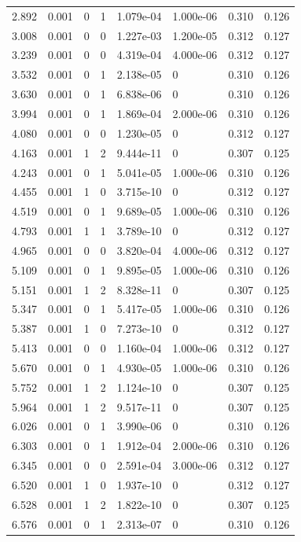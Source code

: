 \documentclass[preview]{standalone}
\begin{document}
{{\begin{tabular}{L{1.2cm}C{1.2cm} C{0.3cm}C{0.5cm} C{1.4cm}C{1.4cm} C{1.4cm}C{1.4cm}}
  2.892  &  0.001  & 0     &  1 &  1.079e-04  & 1.000e-06  & 0.310 &  0.126   \\ 
  3.008  &  0.001  & 0     &  0 &  1.227e-03  & 1.200e-05  & 0.312 &  0.127   \\ 
  3.239  &  0.001  & 0     &  0 &  4.319e-04  & 4.000e-06  & 0.312 &  0.127   \\ 
  3.532  &  0.001  & 0     &  1 &  2.138e-05  & 0  & 0.310 &  0.126   \\ 
  3.630  &  0.001  & 0     &  1 &  6.838e-06  & 0  & 0.310 &  0.126   \\ 
  3.994  &  0.001  & 0     &  1 &  1.869e-04  & 2.000e-06  & 0.310 &  0.126   \\ 
  4.080  &  0.001  & 0     &  0 &  1.230e-05  & 0  & 0.312 &  0.127   \\ 
  4.163  &  0.001  & 1     &  2 &  9.444e-11  & 0  & 0.307 &  0.125   \\ 
  4.243  &  0.001  & 0     &  1 &  5.041e-05  & 1.000e-06  & 0.310 &  0.126   \\ 
  4.455  &  0.001  & 1     &  0 &  3.715e-10  & 0  & 0.312 &  0.127   \\ 
  4.519  &  0.001  & 0     &  1 &  9.689e-05  & 1.000e-06  & 0.310 &  0.126   \\ 
  4.793  &  0.001  & 1     &  1 &  3.789e-10  & 0  & 0.312 &  0.127   \\ 
  4.965  &  0.001  & 0     &  0 &  3.820e-04  & 4.000e-06  & 0.312 &  0.127   \\ 
  5.109  &  0.001  & 0     &  1 &  9.895e-05  & 1.000e-06  & 0.310 &  0.126   \\ 
  5.151  &  0.001  & 1     &  2 &  8.328e-11  & 0  & 0.307 &  0.125   \\ 
  5.347  &  0.001  & 0     &  1 &  5.417e-05  & 1.000e-06  & 0.310 &  0.126   \\ 
  5.387  &  0.001  & 1     &  0 &  7.273e-10  & 0  & 0.312 &  0.127   \\ 
  5.413  &  0.001  & 0     &  0 &  1.160e-04  & 1.000e-06  & 0.312 &  0.127   \\ 
  5.670  &  0.001  & 0     &  1 &  4.930e-05  & 1.000e-06  & 0.310 &  0.126   \\ 
  5.752  &  0.001  & 1     &  2 &  1.124e-10  & 0  & 0.307 &  0.125   \\ 
  5.964  &  0.001  & 1     &  2 &  9.517e-11  & 0  & 0.307 &  0.125   \\ 
  6.026  &  0.001  & 0     &  1 &  3.990e-06  & 0  & 0.310 &  0.126   \\ 
  6.303  &  0.001  & 0     &  1 &  1.912e-04  & 2.000e-06  & 0.310 &  0.126   \\ 
  6.345  &  0.001  & 0     &  0 &  2.591e-04  & 3.000e-06  & 0.312 &  0.127   \\ 
  6.520  &  0.001  & 1     &  0 &  1.937e-10  & 0  & 0.312 &  0.127   \\ 
  6.528  &  0.001  & 1     &  2 &  1.822e-10  & 0  & 0.307 &  0.125   \\ 
  6.576  &  0.001  & 0     &  1 &  2.313e-07  & 0  & 0.310 &  0.126   \\ 
\hline 
\end{tabular} 

}}
\end{document}
